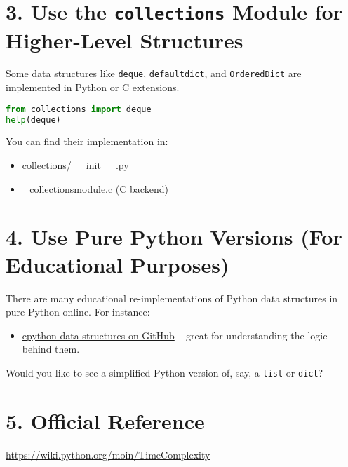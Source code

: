 \documentclass{article}
\begin{document}
\section*{3. Use the \texttt{collections} Module for Higher-Level Structures}

Some data structures like \texttt{deque}, \texttt{defaultdict}, and \texttt{OrderedDict} are implemented in Python or C extensions.

\begin{lstlisting}[language=Python]
from collections import deque
help(deque)
\end{lstlisting}

You can find their implementation in:
\begin{itemize}
  \item \href{https://github.com/python/cpython/blob/main/Lib/collections/__init__.py}{collections/\_\_init\_\_.py}
  \item \href{https://github.com/python/cpython/blob/main/Modules/_collectionsmodule.c}{\_collectionsmodule.c (C backend)}
\end{itemize}

\section*{4. Use Pure Python Versions (For Educational Purposes)}

There are many educational re-implementations of Python data structures in pure Python online. For instance:

\begin{itemize}
  \item \href{https://github.com/trekhleb/py-algorithms}{cpython-data-structures on GitHub} – great for understanding the logic behind them.
\end{itemize}

\vspace{1em}
Would you like to see a simplified Python version of, say, a \texttt{list} or \texttt{dict}?


\section*{5. Official Reference}

\url{https://wiki.python.org/moin/TimeComplexity}
\end{document}
